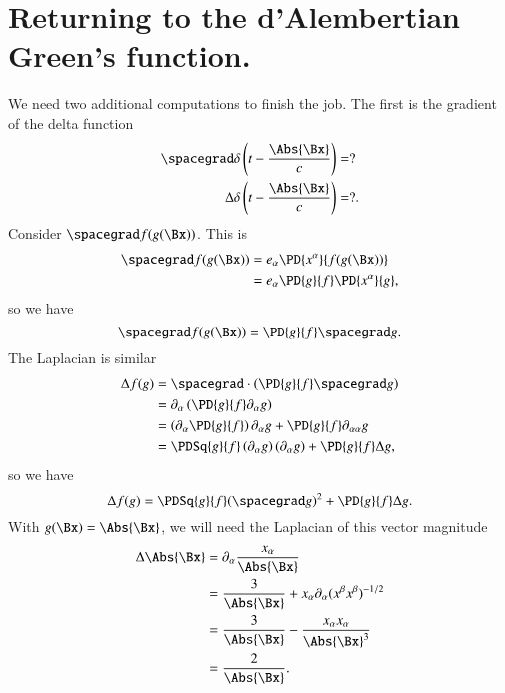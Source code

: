 \section{Returning to the d'Alembertian Green's function.}

We need two additional computations to finish the job.  The first is the gradient of the delta function
%
\begin{equation}\label{eqn:relativisticElectrodynamicsL18:840}
\begin{aligned}
\spacegrad \delta\left(t - \frac{\Abs{\Bx}}{c}\right) &= ? \\
\Delta \delta\left(t - \frac{\Abs{\Bx}}{c}\right) &= ?.
\end{aligned}
\end{equation}
%
Consider \(\spacegrad f(g(\Bx))\).  This is
%
\begin{equation}\label{eqn:relativisticElectrodynamicsL18:860}
\begin{aligned}
\spacegrad f(g(\Bx))
&=
e_\alpha \PD{x^\alpha}{f(g(\Bx))} \\
&=
e_\alpha \PD{g}{f} \PD{x^\alpha}{g},
\end{aligned}
\end{equation}
so we have
\begin{equation}\label{eqn:relativisticElectrodynamicsL18:400}
\spacegrad f(g(\Bx))
=
\PD{g}{f} \spacegrad g.
\end{equation}
%
The Laplacian is similar
%
\begin{equation}\label{eqn:relativisticElectrodynamicsL18:880}
\begin{aligned}
\Delta f(g)
&=
\spacegrad \cdot \left(\PD{g}{f} \spacegrad g \right) \\
&=
\partial_\alpha \left(\PD{g}{f} \partial_\alpha g \right) \\
&=
\left( \partial_\alpha \PD{g}{f} \right) \partial_\alpha g
+\PD{g}{f} \partial_{\alpha\alpha} g  \\
&=
\PDSq{g}{f} \left( \partial_\alpha g \right) (\partial_\alpha g)
+\PD{g}{f} \Delta g,
\end{aligned}
\end{equation}
%
so we have
%
\begin{equation}\label{eqn:relativisticElectrodynamicsL18:420}
\Delta f(g)
=
\PDSq{g}{f} (\spacegrad g)^2 +\PD{g}{f} \Delta g.
\end{equation}
%
With \(g(\Bx) = \Abs{\Bx}\), we will need the Laplacian of this vector magnitude
%
\begin{equation}\label{eqn:relativisticElectrodynamicsL18:900}
\begin{aligned}
\Delta \Abs{\Bx}
&=
\partial_\alpha \frac{x_\alpha}{\Abs{\Bx}} \\
&=
\frac{3}{\Abs{\Bx}}
+ x_\alpha \partial_\alpha (x^\beta x^\beta)^{-1/2} \\
&=
\frac{3}{\Abs{\Bx}}
- \frac{x_\alpha x_\alpha}{\Abs{\Bx}^3} \\
&= \frac{2}{\Abs{\Bx}}.
\end{aligned}
\end{equation}
